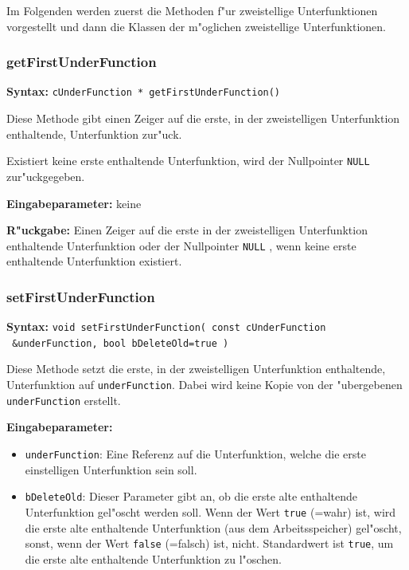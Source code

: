 Im Folgenden werden zuerst die Methoden f"ur zweistellige Unterfunktionen vorgestellt und dann die Klassen der m"oglichen zweistellige Unterfunktionen.


\subsubsection{getFirstUnderFunction}

\textbf{Syntax:} \verb|cUnderFunction * getFirstUnderFunction()|

\bigskip\noindent
Diese Methode gibt einen Zeiger auf die erste, in der zweistelligen Unterfunktion enthaltende, Unterfunktion zur"uck.

Existiert keine erste enthaltende Unterfunktion, wird der Nullpointer \verb|NULL| zur"uckgegeben.

\bigskip\noindent
\textbf{Eingabeparameter:} keine

\bigskip\noindent
\textbf{R"uckgabe:} Einen Zeiger auf die erste in der zweistelligen Unterfunktion enthaltende Unterfunktion oder der Nullpointer \verb|NULL| , wenn keine erste enthaltende Unterfunktion existiert.


\subsubsection{setFirstUnderFunction}

\textbf{Syntax:} \verb|void setFirstUnderFunction( const cUnderFunction| \\\verb| &underFunction, bool bDeleteOld=true )|

\bigskip\noindent
Diese Methode setzt die erste, in der zweistelligen Unterfunktion enthaltende, Unterfunktion auf \verb|underFunction|. Dabei wird keine Kopie von der "ubergebenen \verb|underFunction| erstellt.

\bigskip\noindent
\textbf{Eingabeparameter:}
\begin{itemize}
 \item \verb|underFunction|: Eine Referenz auf die Unterfunktion, welche die erste einstelligen Unterfunktion sein soll.
 \item \verb|bDeleteOld|: Dieser Parameter gibt an, ob die erste alte enthaltende Unterfunktion gel"oscht werden soll. Wenn der Wert \verb|true| (=wahr) ist, wird die erste alte enthaltende Unterfunktion (aus dem Arbeitsspeicher) gel"oscht, sonst, wenn der Wert \verb|false| (=falsch) ist, nicht. Standardwert ist \verb|true|, um die erste alte enthaltende Unterfunktion zu l"oschen.
\end{itemize}

